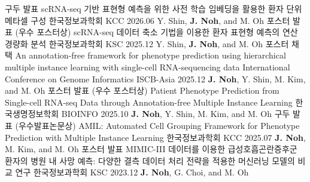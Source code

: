 \documentclass[11pt, a4paper]{awesome-cv}
\let\origcvsection\cvsection
\renewcommand{\cvsection}[1]{\needspace{7\baselineskip}\origcvsection{#1}}
\let\origcvsubsection\cvsubsection
\renewcommand{\cvsubsection}[1]{\needspace{5\baselineskip}\origcvsubsection{#1}}
\begin{document}
\begin{cventries}
\cventry
    {구두 발표}
    {scRNA-seq 기반 표현형 예측을 위한 사전 학습 임베딩을 활용한 환자 단위 메타셀 구성}
    {한국정보과학회 KCC}
    {2026.06}
    {
      Y. Shin, \textbf{J. Noh}, and M. Oh
    }
\vspace{3.5mm}
\cventry
    {포스터 발표 (우수 포스터상)}
    {scRNA-seq 데이터 축소 기법을 이용한 환자 표현형 예측의 연산 경량화 분석}
    {한국정보과학회 KSC}
    {2025.12}
    {
      Y. Shin, \textbf{J. Noh}, and M. Oh
    }
\vspace{3.5mm}
\cventry
    {포스터 채택}
    {An annotation-free framework for phenotype prediction using hierarchical multiple instance learning with single-cell RNA-sequencing data}
    {International Conference on Genome Informatics ISCB-Asia}
    {2025.12}
    {
      \textbf{J. Noh}, Y. Shin, M. Kim, and M. Oh
    }
\vspace{3.5mm}
\cventry
    {포스터 발표 (우수 포스터상)}
    {Patient Phenotype Prediction from Single-cell RNA-seq Data through Annotation-free Multiple Instance Learning}
    {한국생명정보학회 BIOINFO}
    {2025.10}
    {
      \textbf{J. Noh}, Y. Shin, M. Kim, and M. Oh
    }
\vspace{3.5mm}
\cventry
    {구두 발표 (우수발표논문상)}
    {AMIL: Automated Cell Grouping Framework for Phenotype Prediction with Multiple Instance Learning}
    {한국정보과학회 KCC}
    {2025.07}
    {
      \textbf{J. Noh}, M. Kim, and M. Oh
    }
\vspace{3.5mm}
\cventry
    {포스터 발표}
    {MIMIC-III 데이터를 이용한 급성호흡곤란증후군 환자의 병원 내 사망 예측: 다양한 결측 데이터 처리 전략을 적용한 머신러닝 모델의 비교 연구}
    {한국정보과학회 KSC}
    {2023.12}
    {
      \textbf{J. Noh}, G. Choi, and M. Oh
    }
\end{cventries}


\vspace{1mm}

\end{document}
